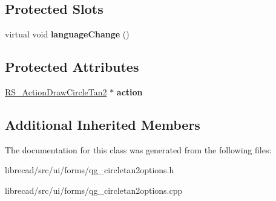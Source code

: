 \subsection*{Protected Slots}
\begin{DoxyCompactItemize}
\item 
\hypertarget{classQG__CircleTan2Options_a9d237ece14f55caf9b80fc6c3df90bf1}{virtual void {\bfseries language\-Change} ()}\label{classQG__CircleTan2Options_a9d237ece14f55caf9b80fc6c3df90bf1}

\end{DoxyCompactItemize}
\subsection*{Protected Attributes}
\begin{DoxyCompactItemize}
\item 
\hypertarget{classQG__CircleTan2Options_aad59dddec97168d196c5c7c3ee4d0dcb}{\hyperlink{classRS__ActionDrawCircleTan2}{R\-S\-\_\-\-Action\-Draw\-Circle\-Tan2} $\ast$ {\bfseries action}}\label{classQG__CircleTan2Options_aad59dddec97168d196c5c7c3ee4d0dcb}

\end{DoxyCompactItemize}
\subsection*{Additional Inherited Members}


The documentation for this class was generated from the following files\-:\begin{DoxyCompactItemize}
\item 
librecad/src/ui/forms/qg\-\_\-circletan2options.\-h\item 
librecad/src/ui/forms/qg\-\_\-circletan2options.\-cpp\end{DoxyCompactItemize}
